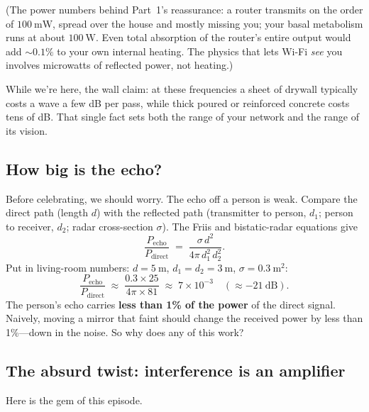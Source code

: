 \documentclass[11pt, letterpaper]{article}
\begin{document}
(The power numbers behind Part~1's reassurance: a router transmits on the order of $100\ \text{mW}$, spread over the house and mostly missing you; your basal metabolism runs at about $100\ \text{W}$. Even total absorption of the router's entire output would add $\sim 0.1\%$ to your own internal heating. The physics that lets Wi-Fi \textit{see} you involves microwatts of reflected power, not heating.)

While we're here, the wall claim: at these frequencies a sheet of drywall typically costs a wave a few dB per pass, while thick poured or reinforced concrete costs tens of dB. That single fact sets both the range of your network and the range of its vision.

\subsection{How big is the echo?}

Before celebrating, we should worry. The echo off a person is weak. Compare the direct path (length $d$) with the reflected path (transmitter to person, $d_1$; person to receiver, $d_2$; radar cross-section $\sigma$). The Friis and bistatic-radar equations give
\begin{equation}
  \frac{P_{\text{echo}}}{P_{\text{direct}}}
  \;=\; \frac{\sigma\, d^2}{4\pi\, d_1^2\, d_2^2} .
\end{equation}
Put in living-room numbers: $d = 5\ \text{m}$, $d_1 = d_2 = 3\ \text{m}$, $\sigma = 0.3\ \text{m}^2$:
\begin{equation}
  \frac{P_{\text{echo}}}{P_{\text{direct}}} \;\approx\; \frac{0.3 \times 25}{4\pi \times 81}
  \;\approx\; 7\times 10^{-3} \quad (\approx -21\ \text{dB}).
\end{equation}
The person's echo carries \textbf{less than 1\% of the power} of the direct signal. Naively, moving a mirror that faint should change the received power by less than 1\%---down in the noise. So why does any of this work?

\subsection{The absurd twist: interference is an amplifier}

Here is the gem of this episode.
\end{document}
